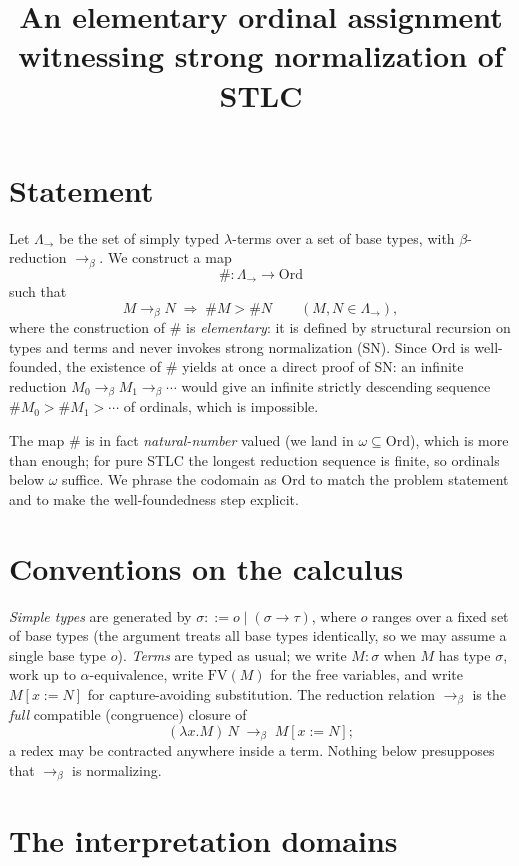 \documentclass{amsart}
\theoremstyle{definition}
\newcommand{\Ord}{\mathrm{Ord}}
\newcommand{\To}{\to_\beta}
\newcommand{\FV}{\mathrm{FV}}
\begin{document}
\title{An elementary ordinal assignment witnessing strong normalization of STLC}
\maketitle

\section{Statement}

Let $\Lambda_\to$ be the set of simply typed $\lambda$-terms over a set of base
types, with $\beta$-reduction $\To$. We construct a map
\[
  \# : \Lambda_\to \longrightarrow \Ord
\]
such that
\[
  M \To N \;\Longrightarrow\; \#M > \#N \qquad (M,N\in\Lambda_\to),
\]
where the construction of $\#$ is \emph{elementary}: it is defined by structural
recursion on types and terms and never invokes strong normalization (SN). Since
$\Ord$ is well-founded, the existence of $\#$ yields at once a direct proof of SN:
an infinite reduction $M_0\To M_1\To\cdots$ would give an infinite strictly
descending sequence $\#M_0 > \#M_1 > \cdots$ of ordinals, which is impossible.

The map $\#$ is in fact \emph{natural-number} valued (we land in $\omega\subseteq\Ord$),
which is more than enough; for pure STLC the longest reduction sequence is finite, so
ordinals below $\omega$ suffice. We phrase the codomain as $\Ord$ to match the problem
statement and to make the well-foundedness step explicit.

\section{Conventions on the calculus}

\emph{Simple types} are generated by $\sigma ::= o \mid (\sigma\to\tau)$, where $o$
ranges over a fixed set of base types (the argument treats all base types identically,
so we may assume a single base type $o$). \emph{Terms} are typed as usual; we write
$M:\sigma$ when $M$ has type $\sigma$, work up to $\alpha$-equivalence, write $\FV(M)$
for the free variables, and write $M[x:=N]$ for capture-avoiding substitution. The
reduction relation $\To$ is the \emph{full} compatible (congruence) closure of
\[
  (\lambda x.M)\,N \;\To\; M[x:=N];
\]
a redex may be contracted anywhere inside a term. Nothing below presupposes that $\To$
is normalizing.

\section{The interpretation domains}
\end{document}
